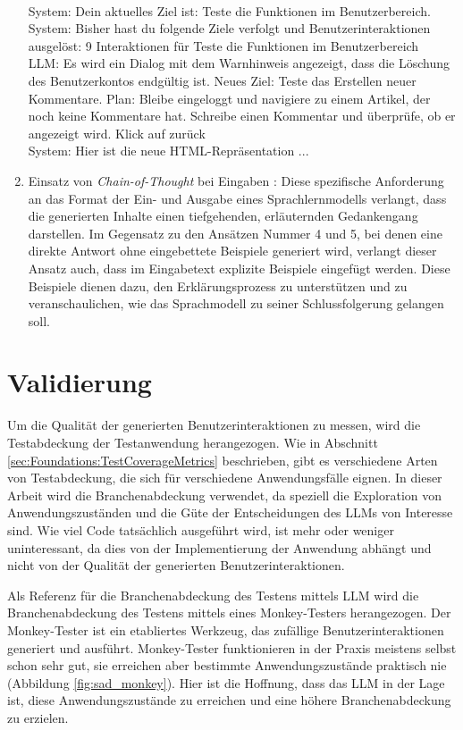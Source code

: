 \begin{enumerate}
{    \\
    System: Dein aktuelles Ziel ist: Teste die Funktionen im Benutzerbereich.
    \\
    System: Bisher hast du folgende Ziele verfolgt und Benutzerinteraktionen ausgelöst: 9 Interaktionen für \glqq{}Teste die Funktionen im Benutzerbereich\grqq{}
    \\
    LLM: Es wird ein Dialog mit dem Warnhinweis angezeigt, dass die Löschung des Benutzerkontos endgültig ist.
    Neues Ziel: Teste das Erstellen neuer Kommentare.
    Plan: Bleibe eingeloggt und navigiere zu einem Artikel, der noch keine Kommentare hat. Schreibe einen Kommentar und überprüfe, ob er angezeigt wird.
    Klick auf \dq zurück\dq
    \\
    System: Hier ist die neue HTML-Repräsentation ...
    }
    \item Einsatz von \textit{Chain-of-Thought} bei Eingaben  \cite{chain-of-thought}:
    Diese spezifische Anforderung an das Format der Ein- und Ausgabe eines Sprachlernmodells verlangt, dass die generierten Inhalte einen tiefgehenden, erläuternden Gedankengang darstellen.
    Im Gegensatz zu den Ansätzen Nummer 4 und 5, bei denen eine direkte Antwort ohne eingebettete Beispiele generiert wird, verlangt dieser Ansatz auch, dass im Eingabetext explizite Beispiele eingefügt werden.
    Diese Beispiele dienen dazu, den Erklärungsprozess zu unterstützen und zu veranschaulichen, wie das Sprachmodell zu seiner Schlussfolgerung gelangen soll.
\end{enumerate}

\section{Validierung}
\label{sec:vaildation}

Um die Qualität der generierten Benutzerinteraktionen zu messen, wird die Testabdeckung der Testanwendung herangezogen.
Wie in Abschnitt \ref{sec:Foundations:TestCoverageMetrics} beschrieben, gibt es verschiedene Arten von Testabdeckung, die sich für verschiedene Anwendungsfälle eignen.
In dieser Arbeit wird die Branchenabdeckung verwendet, da speziell die Exploration von Anwendungszuständen und die Güte der Entscheidungen des LLMs von Interesse sind.
Wie viel Code tatsächlich ausgeführt wird, ist mehr oder weniger uninteressant, da dies von der Implementierung der Anwendung abhängt und nicht von der Qualität der generierten Benutzerinteraktionen.

Als Referenz für die Branchenabdeckung des Testens mittels LLM wird die Branchenabdeckung des Testens mittels eines Monkey-Testers herangezogen.
Der Monkey-Tester ist ein etabliertes Werkzeug, das zufällige Benutzerinteraktionen generiert und ausführt.
Monkey-Tester funktionieren in der Praxis meistens selbst schon sehr gut, sie erreichen aber bestimmte Anwendungszustände praktisch nie (Abbildung \ref{fig:sad_monkey}).
Hier ist die Hoffnung, dass das LLM in der Lage ist, diese Anwendungszustände zu erreichen und eine höhere Branchenabdeckung zu erzielen.

